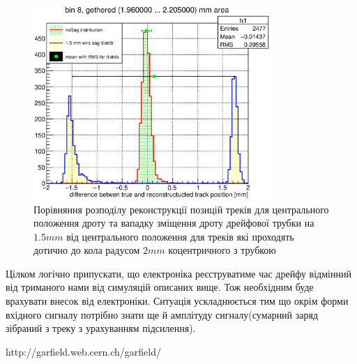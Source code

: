 \documentclass[]{article}
\begin{document}
	\begin{figure}[h!]
	\includegraphics[width=0.8\textwidth]{bin8_2mm.eps}
	\centering
	\caption{ Порівняння розподілу реконструкції позицій треків для центрального положення дроту та вападку зміщення дроту дрейфової трубки на $1.5 mm$ від центрального положення для треків які проходять дотично до кола радусом $2mm$  коцентричного з трубкою}
	\end{figure}
	
	Цілком логічно припускати, що електроніка реєструватиме час дрейфу відмінний від триманого нами від симуляцій описаних вище. Тож необхідним буде врахувати внесок від електроніки. Ситуація ускладнюється тим що окрім форми вхідного сигналу потрібно знати ще й амплітуду сигналу(сумарний заряд зібраний з треку з урахуванням підсилення).
	
\newpage
\begin{thebibliography}{00}
	 http://garfield.web.cern.ch/garfield/
\end{thebibliography}
	
\end{document}
